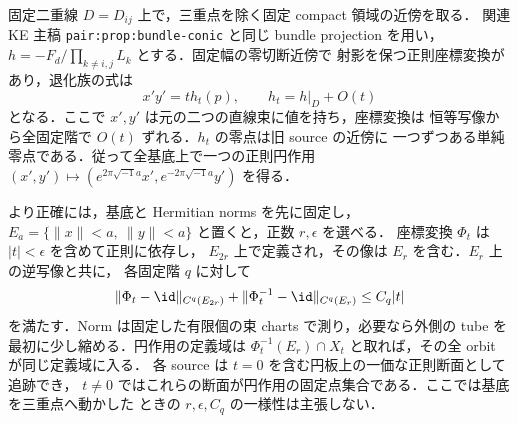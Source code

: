 \begin{lemma}
\label{ke:projected-source-normal-form}
固定二重線 $D=D_{ij}$ 上で，三重点を除く固定 compact 領域の近傍を取る．
関連 KE 主稿 \texttt{pair:prop:bundle-conic} と同じ bundle projection を用い，
$h=-F_d/\prod_{k\ne i,j}L_k$ とする．固定幅の零切断近傍で
射影を保つ正則座標変換があり，退化族の式は
\[
 x'y'=t h_t(p),\qquad h_t=h|_D+O(t)
\]
となる．ここで $x',y'$ は元の二つの直線束に値を持ち，座標変換は
恒等写像から全固定階で $O(t)$ ずれる．$h_t$ の零点は旧 source の近傍に
一つずつある単純零点である．従って全基底上で一つの正則円作用
$(x',y')\mapsto(e^{2\pi\sqrt{-1}a}x',e^{-2\pi\sqrt{-1}a}y')$ を得る．

より正確には，基底と Hermitian norms を先に固定し，
$E_a=\{\|x\|<a,\ \|y\|<a\}$ と置くと，正数 $r,\epsilon$ を選べる．
座標変換 $\Phi_t$ は $|t|<\epsilon$ を含めて正則に依存し，
$E_{2r}$ 上で定義され，その像は $E_r$ を含む．$E_r$ 上の逆写像と共に，
各固定階 $q$ に対して
\begin{equation}\label{ke:eq:source-normal-form-common-domain}
 \|\Phi_t-\id\|_{C^q(E_{2r})}
 +\|\Phi_t^{-1}-\id\|_{C^q(E_r)}\le C_q|t|
\end{equation}
を満たす．Norm は固定した有限個の束 charts で測り，必要なら外側の
tube を最初に少し縮める．円作用の定義域は
$\Phi_t^{-1}(E_r)\cap X_t$ と取れば，その全 orbit が同じ定義域に入る．
各 source は $t=0$ を含む円板上の一価な正則断面として追跡でき，
$t\ne0$ ではこれらの断面が円作用の固定点集合である．ここでは基底を三重点へ動かした
ときの $r,\epsilon,C_q$ の一様性は主張しない．
\end{lemma}

